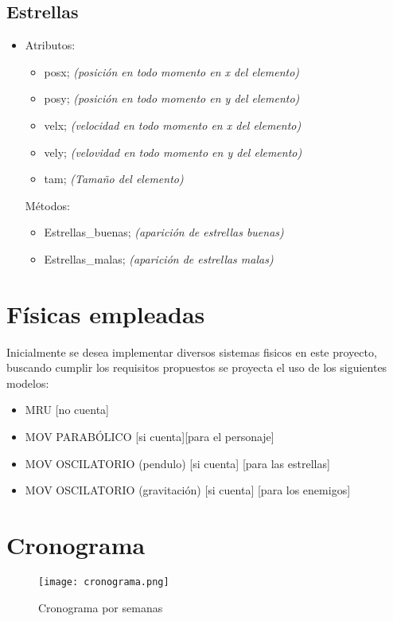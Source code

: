 \documentclass{article}
\begin{document}
\subsection{Estrellas}
\begin{itemize}
    \item Atributos:
    \begin{itemize}
        \item posx; \textit{(posición en todo momento en x del elemento)}
        \item posy; \textit{(posición en todo momento en y del elemento)}
        \item velx; \textit{(velocidad en todo momento en x del elemento)}
        \item vely; \textit{(velovidad en todo momento en y del elemento)}
        \item tam;  \textit{(Tamaño del elemento)}
    \end{itemize}
    Métodos:
    \begin{itemize}
        \item Estrellas\_buenas; \textit{(aparición de estrellas buenas)}
        \item Estrellas\_malas; \textit{(aparición de estrellas malas)}
    \end{itemize}
\end{itemize}

\section{Físicas empleadas} \label{contenido}
Inicialmente se desea implementar diversos sistemas fisicos en este proyecto, buscando cumplir los requisitos propuestos se proyecta el uso de los siguientes modelos:
\begin{itemize}
    \item MRU [no cuenta]
    \item MOV PARABÓLICO [si cuenta][para el personaje]
    \item MOV OSCILATORIO (pendulo) [si cuenta] [para las estrellas]
    \item MOV OSCILATORIO (gravitación) [si cuenta] [para los enemigos]
\end{itemize}

\section{Cronograma} \label{contenido}
\begin{figure}[h]
    \centering
    \texttt{[image: cronograma.png]}
    \caption{Cronograma por semanas}
    \label{fig:cronograma}
    \end{figure}
\end{document}
